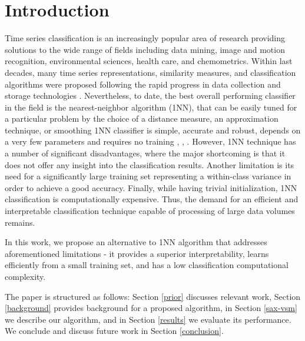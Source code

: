 \documentclass[conference]{IEEEtran}
\begin{document}
%

\vspace{-0.1cm}
\section{Introduction}
\vspace{-0.1cm}
Time series classification is an increasingly popular area of research providing 
solutions to the wide range of fields including data mining, 
image and motion recognition, environmental sciences, health care, and chemometrics. 
Within last decades, many time series representations, similarity measures, 
and classification algorithms were proposed following the rapid
progress in data collection and storage technologies \cite{review}. 
Nevertheless, to date, the best overall performing classifier in the field is
the nearest-neighbor algorithm (1NN), that can be easily tuned for a 
particular problem by the choice of a distance measure, 
an approximation technique, or smoothing \cite{review}
1NN classifier is simple, accurate and robust, depends on a very few parameters 
and requires no training \cite{review}, \cite{benchmark}, \cite{classifiers}.
However, 1NN technique has a number of significant disadvantages, where the 
major shortcoming is that it does not 
offer any insight into the classification results.
Another limitation is its need for a significantly large training set 
representing a within-class variance in order to achieve a good accuracy. 
Finally, while having trivial initialization, 1NN classification is computationally expensive. 
Thus, the demand for an efficient and interpretable classification technique 
capable of processing of large data volumes remains.

In this work, we propose an alternative to 1NN algorithm that addresses 
aforementioned limitations - it provides a superior interpretability, 
learns efficiently from a small training set, and has a low classification 
computational complexity.

The paper is structured as follows: 
Section \ref{prior} discusses relevant work, Section \ref{background} provides 
background for a proposed algorithm, in Section \ref{sax-vsm} we describe our algorithm, 
and in Section \ref{results} we evaluate its performance. 
We conclude and discuss future work in Section \ref{conclusion}.
\end{document}
